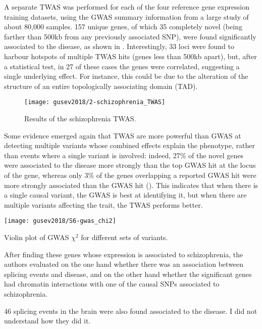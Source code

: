 \documentclass[../main.tex]{subfiles}
\begin{document}
A separate TWAS was performed for each of the four reference gene 
expression training datasets, using the GWAS summary information from a 
large study of about 80,000 samples. 157 unique genes, of which 35 
completely novel (\ie being farther than 500kb from any previously 
associated SNP), were found significantly associated to the disease, as 
shown in . Interestingly, 33 loci were found to 
harbour hotspots of multiple TWAS hits (\ie genes less than 500kb 
apart), but, after a statistical test, in 27 of these cases the genes 
were correlated, suggesting a single underlying effect. For instance, 
this could be due to the alteration of the structure of an entire 
topologically associating domain (TAD).


\begin{figure}
	\texttt{[image: gusev2018/2-schizophrenia\_TWAS]}
	\caption{Results of the schizophrenia TWAS.}
\end{figure}

Some evidence emerged again that TWAS are more powerful than GWAS at 
detecting multiple variants whose combined effects explain the 
phenotype, rather than events where a single variant is involved: 
indeed, 27\% of the novel genes were associated to the disease more 
strongly than the top GWAS hit at the locus of the gene, whereas only 
3\% of the genes overlapping a reported GWAS hit were more strongly 
associated than the GWAS hit (). This indicates 
that when there is a single causal variant, the GWAS is best at 
identifying it, but when there are multiple variants affecting the 
trait, the TWAS performs better.

\begin{marginfigure}
	\texttt{[image: gusev2018/S6-gwas\_chi2]}
	\caption{Violin plot of GWAS $\chi^2$ for different sets of 
variants.}
\end{marginfigure}

After finding these genes whose expression is associated to 
schizophrenia, the authors evaluated on the one hand whether there was 
an association between splicing events and disease, and on the other 
hand whether the significant genes had chromatin interactions with one 
of the causal SNPs associated to schizophrenia.

46 splicing events in the brain were also found associated to the 
   disease. I did not understand how they did it.
\end{document}
